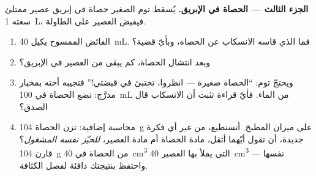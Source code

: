 \begin{problem}
\medskip\noindent\textbf{الجزء الثالث --- الحصاة في الإبريق.}
يُسقط توم الصغير حصاة في إبريق عصير ممتلئ سعته \qty{1}{L}،
فيفيض العصير على الطاولة.
\begin{enumerate}[resume]
  \item الفائض الممسوح يكيل \qty{40}{mL}. فما الذي قاسه
        الانسكاب عن الحصاة، وبأيّ قضية؟
  \item وبعد انتشال الحصاة، كم يبقى من العصير في الإبريق؟
  \item ويحتجّ توم: ``الحصاة صغيرة --- انظروا، تختبئ في قبضتي!''
        فتجيبه أخته بمخبار مدرَّج: تضع الحصاة في \qty{100}{mL}
        من الماء. فأيّ قراءة تثبت أن الانسكاب قال الصدق؟
  \item محاسبة إضافية: تزن الحصاة \qty{104}{g} على ميزان
        المطبخ. أتستطيع، من غير أي فكرة جديدة، أن تقول أيّهما
        أثقل، مادة الحصاة أم مادة العصير، \emph{للحيّز نفسه
        المشغول}؟ قارن \qty{104}{g} من الحصاة في \qty{40}{cm^3}
         التي يملأ بها العصير \qty{40}{cm^3} نفسها ---
        واحتفظ بنتيجتك دافئة لفصل الكثافة.
\end{enumerate}
\end{problem}
